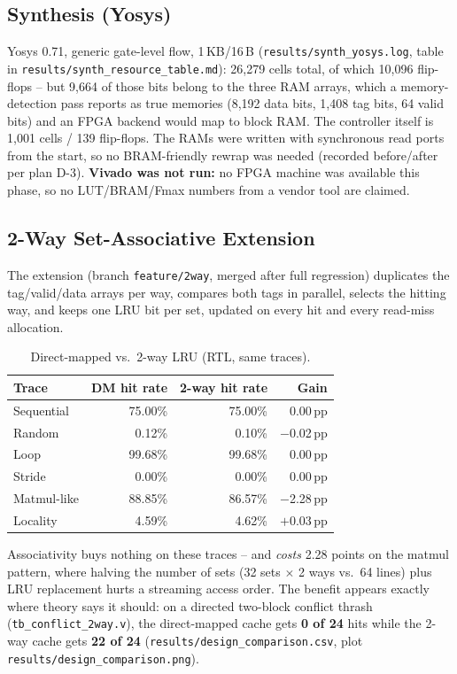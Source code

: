 \documentclass[conference]{IEEEtran}
\begin{document}
\subsection{Synthesis (Yosys)}
Yosys 0.71, generic gate-level flow, 1\,KB/16\,B
(\texttt{results/synth\_yosys.log}, table in
\texttt{results/synth\_resource\_table.md}): 26{,}279 cells total, of which
10{,}096 flip-flops -- but 9{,}664 of those bits belong to the three RAM
arrays, which a memory-detection pass reports as true memories (8{,}192 data
bits, 1{,}408 tag bits, 64 valid bits) and an FPGA backend would map to block
RAM. The controller itself is 1{,}001 cells / 139 flip-flops. The RAMs were
written with synchronous read ports from the start, so no BRAM-friendly
rewrap was needed (recorded before/after per plan D-3). \textbf{Vivado was
not run:} no FPGA machine was available this phase, so no LUT/BRAM/Fmax
numbers from a vendor tool are claimed.

\subsection{2-Way Set-Associative Extension}
The extension (branch \texttt{feature/2way}, merged after full regression)
duplicates the tag/valid/data arrays per way, compares both tags in
parallel, selects the hitting way, and keeps one LRU bit per set, updated on
every hit and every read-miss allocation.

\begin{table}[htbp]
  \centering
  \caption{Direct-mapped vs.\ 2-way LRU (RTL, same traces).}
  \begin{tabular}{lrrr}
    \toprule
    Trace & DM hit rate & 2-way hit rate & Gain \\
    \midrule
    Sequential  & 75.00\% & 75.00\% & 0.00\,pp \\
    Random      & 0.12\%  & 0.10\%  & $-$0.02\,pp \\
    Loop        & 99.68\% & 99.68\% & 0.00\,pp \\
    Stride      & 0.00\%  & 0.00\%  & 0.00\,pp \\
    Matmul-like & 88.85\% & 86.57\% & $-$2.28\,pp \\
    Locality    & 4.59\%  & 4.62\%  & $+$0.03\,pp \\
    \bottomrule
  \end{tabular}
\end{table}

Associativity buys nothing on these traces -- and \emph{costs} 2.28 points on
the matmul pattern, where halving the number of sets (32 sets $\times$ 2 ways
vs.\ 64 lines) plus LRU replacement hurts a streaming access order. The
benefit appears exactly where theory says it should: on a directed two-block
conflict thrash (\texttt{tb\_conflict\_2way.v}), the direct-mapped cache gets
\textbf{0 of 24} hits while the 2-way cache gets \textbf{22 of 24}
(\texttt{results/design\_comparison.csv}, plot
\texttt{results/design\_comparison.png}).
\end{document}
